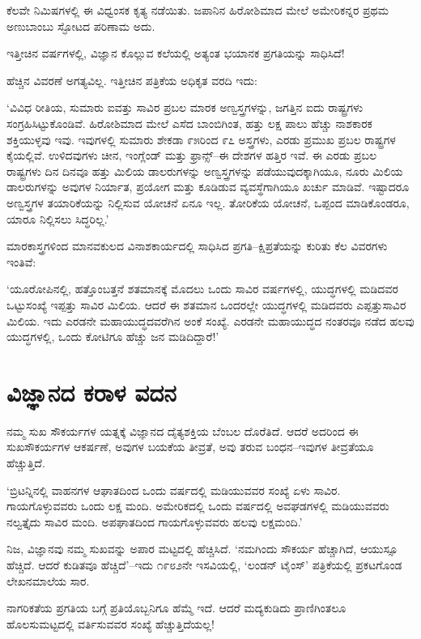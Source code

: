 ಕೆಲವೇ ನಿಮಿಷಗಳಲ್ಲಿ ಈ ವಿಧ್ವಂಸಕ ಕೃತ್ಯ ನಡೆಯಿತು. ಜಪಾನಿನ ಹಿರೋಶಿಮಾದ ಮೇಲೆ ಅಮೇರಿಕನ್ನರ ಪ್ರಥಮ ಅಣುಬಾಂಬು ಸ್ಫೋಟದ ಪರಿಣಾಮ ಅದು.

ಇತ್ತೀಚಿನ ವರ್ಷಗಳಲ್ಲಿ, ವಿಜ್ಞಾನ ಕೊಲ್ಲುವ ಕಲೆಯಲ್ಲಿ ಅತ್ಯಂತ ಭಯಾನಕ ಪ್ರಗತಿಯನ್ನು ಸಾಧಿಸಿದೆ!

ಹೆಚ್ಚಿನ ವಿವರಣೆ ಅಗತ್ಯವಿಲ್ಲ. ಇತ್ತೀಚಿನ ಪತ್ರಿಕೆಯ ಅಧಿಕೃತ ವರದಿ ಇದು:

‘ವಿವಿಧ ರೀತಿಯ, ಸುಮಾರು ಐವತ್ತು ಸಾವಿರ ಪ್ರಬಲ ಮಾರಕ ಅಣ್ವಸ್ತ್ರಗಳನ್ನು, ಜಗತ್ತಿನ ಐದು ರಾಷ್ಟ್ರಗಳು ಸಂಗ್ರಹಿಸಿಟ್ಟುಕೊಂಡಿವೆ. ಹಿರೋಶಿಮಾದ ಮೇಲೆ ಎಸೆದ ಬಾಂಬಿಗಿಂತ, ಹತ್ತು ಲಕ್ಷ ಪಾಲು ಹೆಚ್ಚು ನಾಶಕಾರಕ ಶಕ್ತಿಯುಳ್ಳವು ಇವು. ಇವುಗಳಲ್ಲಿ ಸುಮಾರು ಶೇಕಡಾ ೯೫ರಿಂದ ೯೭ ಅಸ್ತ್ರಗಳು, ಎರಡು ಪ್ರಮುಖ ಪ್ರಬಲ ರಾಷ್ಟ್ರಗಳ ಕೈಯಲ್ಲಿವೆ. ಉಳಿದವುಗಳು ಚೀನ, ಇಂಗ್ಲೆಂಡ್ ಮತ್ತು ಫ್ರಾನ್ಸ್​–ಈ ದೇಶಗಳ ಹತ್ತಿರ ಇವೆ. ಈ ಎರಡು ಪ್ರಬಲ ರಾಷ್ಟ್ರಗಳು ದಿನ ದಿನವೂ ಹತ್ತು ಮಿಲಿಯ ಡಾಲರುಗಳನ್ನು ಅಣ್ವಸ್ತ್ರಗಳನ್ನು ಪಡೆಯುವುದಕ್ಕಾಗಿಯೂ, ನೂರು ಮಿಲಿಯ ಡಾಲರುಗಳನ್ನು ಅವುಗಳ ನಿರ್ಯಾತ, ಪ್ರಯೋಗ ಮತ್ತು ಕೂಡಿಡುವ ವ್ಯವಸ್ಥೆಗಾಗಿಯೂ ಖರ್ಚು ಮಾಡಿವೆ. ಇಷ್ಟಾದರೂ ಅಣ್ವಸ್ತ್ರಗಳ ತಯಾರಿಕೆಯನ್ನು ನಿಲ್ಲಿಸುವ ಯೋಚನೆ ಏನೂ ಇಲ್ಲ. ತೋರಿಕೆಯ ಯೋಚನೆ, ಒಪ್ಪಂದ ಮಾಡಿಕೊಂಡರೂ, ಯಾರೂ ನಿಲ್ಲಿಸಲು ಸಿದ್ಧರಿಲ್ಲ.’

ಮಾರಕಾಸ್ತ್ರಗಳಿಂದ ಮಾನವಕುಲದ ವಿನಾಶಕಾರ್ಯದಲ್ಲಿ ಸಾಧಿಸಿದ ಪ್ರಗತಿ–ಕ್ಷಿಪ್ರತೆಯನ್ನು ಕುರಿತು ಕೆಲ ವಿವರಗಳು ಇಂತಿವೆ:

‘ಯೂರೋಪಿನಲ್ಲಿ, ಹತ್ತೊಂಬತ್ತನೆ ಶತಮಾನಕ್ಕೆ ಮೊದಲು ಒಂದು ಸಾವಿರ ವರ್ಷಗಳಲ್ಲಿ, ಯುದ್ಧಗಳಲ್ಲಿ ಮಡಿದವರ ಒಟ್ಟುಸಂಖ್ಯೆ ಇಪ್ಪತ್ತು ಸಾವಿರ ಮಿಲಿಯ. ಆದರೆ ಈ ಶತಮಾನ ಒಂದರಲ್ಲೇ ಯುದ್ಧಗಳಲ್ಲಿ ಮಡಿದವರು ಎಪ್ಪತ್ತುಸಾವಿರ ಮಿಲಿಯ. ಇದು ಎರಡನೇ ಮಹಾ\-ಯುದ್ಧ\-ದವರೆಗಿನ ಅಂಕೆ ಸಂಖ್ಯೆ. ಎರಡನೇ ಮಹಾಯುದ್ಧದ ನಂತರವೂ ನಡೆದ ಹಲವು ಯುದ್ಧಗಳಲ್ಲಿ, ಒಂದು ಕೋಟಿಗೂ ಹೆಚ್ಚು ಜನ ಮಡಿದಿದ್ದಾರೆ!’


\section*{ವಿಜ್ಞಾನದ ಕರಾಳ ವದನ}


ನಮ್ಮ ಸುಖ ಸೌಕರ್ಯಗಳ ಯತ್ನಕ್ಕೆ ವಿಜ್ಞಾನದ ದೈತ್ಯಶಕ್ತಿಯ ಬೆಂಬಲ ದೊರೆತಿದೆ. ಆದರೆ ಅದರಿಂದ ಈ ಸುಖಸೌಕರ್ಯಗಳ ಆಕರ್ಷಣೆ, ಅವುಗಳ ಬಯಕೆಯ ತೀವ್ರತೆ, ಅವು ತರುವ ಬಂಧನ–ಇವುಗಳ ತೀವ್ರತೆಯೂ ಹೆಚ್ಚುತ್ತಿದೆ.

‘ಬ್ರಿಟನ್ನಿನಲ್ಲಿ ವಾಹನಗಳ ಆಘಾತದಿಂದ ಒಂದು ವರ್ಷದಲ್ಲಿ ಮಡಿಯುವವರ ಸಂಖ್ಯೆ ಏಳು ಸಾವಿರ. ಗಾಯಗೊಳ್ಳುವವರು ಒಂದು ಲಕ್ಷ ಮಂದಿ. ಅಮೇರಿಕದಲ್ಲಿ ಒಂದು ವರ್ಷದಲ್ಲಿ ಅವಘಡಗಳಲ್ಲಿ ಮಡಿಯುವವರು ನಲ್ವತ್ತೈದು ಸಾವಿರ ಮಂದಿ. ಅಪಘಾತದಿಂದ ಗಾಯಗೊಳ್ಳುವವರು ಹಲವು ಲಕ್ಷಮಂದಿ.’

ನಿಜ, ವಿಜ್ಞಾನವು ನಮ್ಮ ಸುಖವನ್ನು ಅಪಾರ ಮಟ್ಟದಲ್ಲಿ ಹೆಚ್ಚಿಸಿದೆ. ‘ನಮಗಿಂದು ಸೌಕರ್ಯ ಹೆಚ್ಚಾಗಿದೆ, ಆಯುಸ್ಸೂ ಹೆಚ್ಚಿದೆ. ಆದರೆ ಕುಡಿತವೂ ಹೆಚ್ಚಿದೆ’–ಇದು ೧೯೮೨ನೇ ಇಸವಿಯಲ್ಲಿ, ‘ಲಂಡನ್ ಟೈಂಸ್​’ ಪತ್ರಿಕೆಯಲ್ಲಿ ಪ್ರಕಟಗೊಂಡ ಲೇಖನಮಾಲೆಯ ಸಾರ.

ನಾಗರಿಕತೆಯ ಪ್ರಗತಿಯ ಬಗ್ಗೆ ಪ್ರತಿಯೊಬ್ಬನಿಗೂ ಹೆಮ್ಮೆ ಇದೆ. ಆದರೆ ಮದ್ಯಕುಡಿದು ಪ್ರಾಣಿಗಿಂತಲೂ ಹೊಲಸುಮಟ್ಟದಲ್ಲಿ ವರ್ತಿಸುವವರ ಸಂಖ್ಯೆ ಹೆಚ್ಚುತ್ತಿದೆಯಲ್ಲ!

